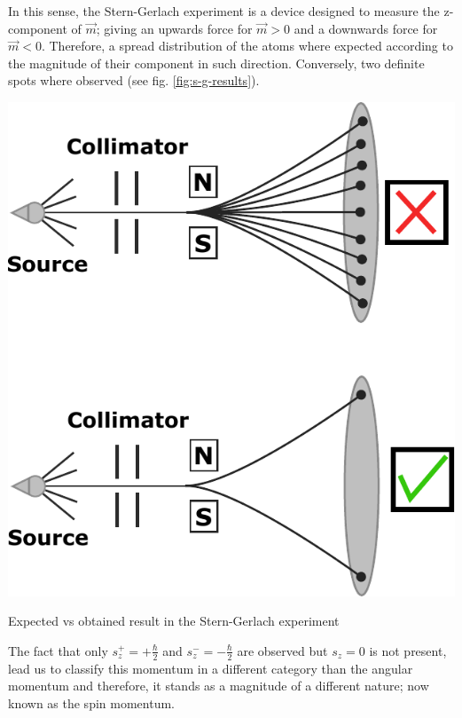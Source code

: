\documentclass{article}
\begin{document}
In this sense, the Stern-Gerlach experiment is a device designed to measure the z-component of $\vec{m}$; giving an upwards force for $\vec{m}>0$ and a downwards force for $\vec{m}<0$. Therefore, a spread distribution of the atoms where expected according to the magnitude of their component in such direction. Conversely, two definite spots where observed (see fig. \ref{fig:s-g-results}).
\begin{marginfigure}%
  \begin{centering}
  \includegraphics[width=\linewidth]{figures/s-g-result.pdf}
  \caption{Expected vs obtained result in the Stern-Gerlach experiment}
  \label{fig:s-g-results}
  \end{centering}
\end{marginfigure}
The fact that only $s_z ^+=+\frac{\hbar}{2}$ and $s_z ^-=-\frac{\hbar}{2}$ are observed but $s_z=0$ is not present, lead us to classify this momentum in a different category than the angular momentum and therefore, it stands as a magnitude of a different nature; now known as the spin momentum.
\end{document}
